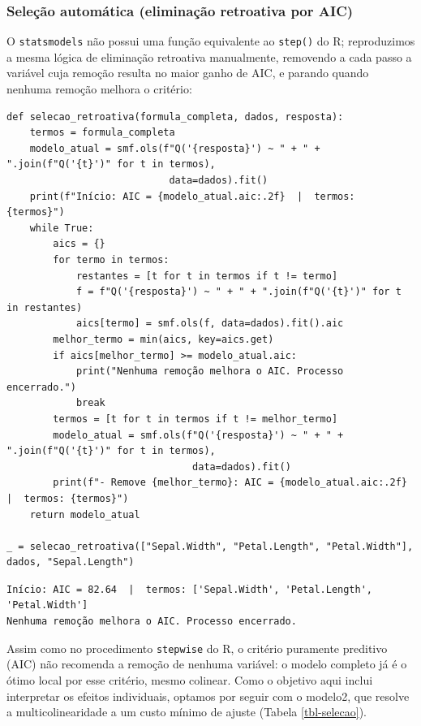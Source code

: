 \documentclass[a4paper]{_extensions/modeloufcg/modeloUFCG}
\begin{document}
\subsubsection{Seleção automática (eliminação retroativa por
AIC)}\label{seleuxe7uxe3o-automuxe1tica-eliminauxe7uxe3o-retroativa-por-aic}

O \texttt{statsmodels} não possui uma função equivalente ao
\texttt{step()} do R; reproduzimos a mesma lógica de eliminação
retroativa manualmente, removendo a cada passo a variável cuja remoção
resulta no maior ganho de AIC, e parando quando nenhuma remoção melhora
o critério:

\begin{verbatim}
def selecao_retroativa(formula_completa, dados, resposta):
    termos = formula_completa
    modelo_atual = smf.ols(f"Q('{resposta}') ~ " + " + ".join(f"Q('{t}')" for t in termos),
                            data=dados).fit()
    print(f"Início: AIC = {modelo_atual.aic:.2f}  |  termos: {termos}")
    while True:
        aics = {}
        for termo in termos:
            restantes = [t for t in termos if t != termo]
            f = f"Q('{resposta}') ~ " + " + ".join(f"Q('{t}')" for t in restantes)
            aics[termo] = smf.ols(f, data=dados).fit().aic
        melhor_termo = min(aics, key=aics.get)
        if aics[melhor_termo] >= modelo_atual.aic:
            print("Nenhuma remoção melhora o AIC. Processo encerrado.")
            break
        termos = [t for t in termos if t != melhor_termo]
        modelo_atual = smf.ols(f"Q('{resposta}') ~ " + " + ".join(f"Q('{t}')" for t in termos),
                                data=dados).fit()
        print(f"- Remove {melhor_termo}: AIC = {modelo_atual.aic:.2f}  |  termos: {termos}")
    return modelo_atual

_ = selecao_retroativa(["Sepal.Width", "Petal.Length", "Petal.Width"], dados, "Sepal.Length")
\end{verbatim}

\begin{verbatim}
Início: AIC = 82.64  |  termos: ['Sepal.Width', 'Petal.Length', 'Petal.Width']
Nenhuma remoção melhora o AIC. Processo encerrado.
\end{verbatim}

Assim como no procedimento \texttt{stepwise} do R, o critério puramente
preditivo (AIC) não recomenda a remoção de nenhuma variável: o modelo
completo já é o ótimo local por esse critério, mesmo colinear. Como o
objetivo aqui inclui interpretar os efeitos individuais, optamos por
seguir com o modelo2, que resolve a multicolinearidade a um custo mínimo
de ajuste (Tabela \ref{tbl-selecao}).
\end{document}
